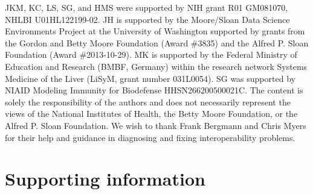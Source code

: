 \documentclass[10pt,letterpaper]{article}
\newcommand{\beginsupplement}{%
        \setcounter{table}{0}
        \renewcommand{\thetable}{S\arabic{table}}%
        \setcounter{figure}{0}
        \renewcommand{\thefigure}{S\arabic{figure}}%
     }
\begin{document}
JKM, KC, LS, SG, and HMS were supported by NIH grant R01 GM081070, NHLBI U01HL122199-02. JH is supported by the Moore/Sloan Data Science Environments Project at the University of Washington supported by grants from the Gordon and Betty Moore Foundation (Award \#3835) and the Alfred P. Sloan Foundation (Award \#2013-10-29). MK is supported by the Federal Ministry of Education and Research (BMBF, Germany) within the research network Systems Medicine of the Liver (LiSyM, grant number 031L0054). SG was supported by NIAID Modeling Immunity for Biodefense HHSN266200500021C. The content is solely the responsibility of the authors and does not necessarily represent the views of the National Institutes of Health, the Betty Moore Foundation, or the Alfred P. Sloan Foundation.
We wish to thank Frank Bergmann and Chris Myers for their help and guidance in diagnosing and fixing interoperability problems.

\section*{Supporting information}



\beginsupplement
\end{document}
